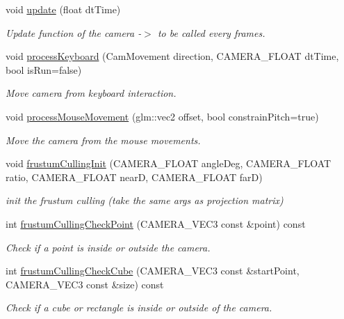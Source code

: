 \begin{DoxyCompactItemize}
void \hyperlink{class_camera_ad1272976ffb7a0d535c8977ec063201d}{update} (float dt\+Time)
\begin{DoxyCompactList}\small\item\em Update function of the camera -\/$>$ to be called every frames. \end{DoxyCompactList}\item 
void \hyperlink{class_camera_a1f28b91cb62dd318b5acf27296c99242}{process\+Keyboard} (Cam\+Movement direction, C\+A\+M\+E\+R\+A\+\_\+\+F\+L\+O\+AT dt\+Time, bool is\+Run=false)
\begin{DoxyCompactList}\small\item\em Move camera from keyboard interaction. \end{DoxyCompactList}\item 
void \hyperlink{class_camera_abd790165abfcc82595470328193060de}{process\+Mouse\+Movement} (glm\+::vec2 offset, bool constrain\+Pitch=true)
\begin{DoxyCompactList}\small\item\em Move the camera from the mouse movements. \end{DoxyCompactList}\item 
void \hyperlink{class_camera_a4287af0eacc2cf50765360a8e1b5db74}{frustum\+Culling\+Init} (C\+A\+M\+E\+R\+A\+\_\+\+F\+L\+O\+AT angle\+Deg, C\+A\+M\+E\+R\+A\+\_\+\+F\+L\+O\+AT ratio, C\+A\+M\+E\+R\+A\+\_\+\+F\+L\+O\+AT nearD, C\+A\+M\+E\+R\+A\+\_\+\+F\+L\+O\+AT farD)
\begin{DoxyCompactList}\small\item\em init the frustum culling (take the same args as projection matrix) \end{DoxyCompactList}\item 
int \hyperlink{class_camera_aa7a544e123a54e98509cfc6050869aca}{frustum\+Culling\+Check\+Point} (C\+A\+M\+E\+R\+A\+\_\+\+V\+E\+C3 const \&point) const
\begin{DoxyCompactList}\small\item\em Check if a point is inside or outside the camera. \end{DoxyCompactList}\item 
int \hyperlink{class_camera_a7baca010a22bac712351e4c6adca5acf}{frustum\+Culling\+Check\+Cube} (C\+A\+M\+E\+R\+A\+\_\+\+V\+E\+C3 const \&start\+Point, C\+A\+M\+E\+R\+A\+\_\+\+V\+E\+C3 const \&size) const
\begin{DoxyCompactList}\small\item\em Check if a cube or rectangle is inside or outside of the camera. \end{DoxyCompactList}\item 

\end{DoxyCompactItemize}
